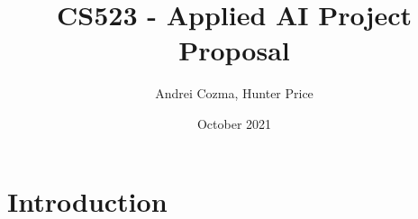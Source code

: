 \documentclass{article}
\title{CS523 - Applied AI Project Proposal}
\author{Andrei Cozma, Hunter Price}
\date{October 2021}
\begin{document}
\maketitle

\section{Introduction}
\end{document}
